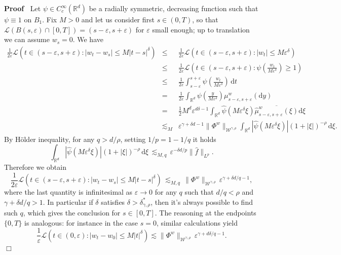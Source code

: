 \documentclass[10pt]{article}
\newcommand{\comma}{{,}}
\newcommand{\mathd}{\mathrm{d}}
\newenvironment{proof}{\noindent\textbf{Proof\ }}{\hspace*{\fill}$\Box$\medskip}
\begin{document}
\begin{proof}
  Let $\psi \in C^{\infty}_c (\mathbb{R}^d)$ be a radially symmetric,
  decreasing function such that $\psi \equiv 1$ on $B_1$. Fix $M > 0$ and let
  us consider first $s \in (0, T)$, so that $\mathcal{L} (B (s, \varepsilon)
  \cap [0, T]) = (s - \varepsilon, s + \varepsilon)$ for $\varepsilon$ small
  enough; up to translation we can assume $w_s = 0$. We have
  \begin{eqnarray*}
    \frac{1}{2 \varepsilon} \mathcal{L} (t \in (s - \varepsilon, s +
    \varepsilon) : | w_t - w_s | \leqslant M | t - s |^{\delta}) & \leqslant &
    \frac{1}{2 \varepsilon} \mathcal{L} (t \in (s - \varepsilon, s +
    \varepsilon) : | w_t | \leqslant M \varepsilon^{\delta})\\
    & \leqslant & \frac{1}{2 \varepsilon} \mathcal{L} \left( t \in (s -
    \varepsilon, s + \varepsilon) : \psi \left( \frac{w_t}{M
    \varepsilon^{\delta}} \right) \geqslant 1 \right)\\
    & \leqslant & \frac{1}{2 \varepsilon} \int_{s - \varepsilon}^{s +
    \varepsilon} \psi \left( \frac{w_t}{M \varepsilon^{\delta}} \right) \,
    \mathd t\\
    & = & \frac{1}{2 \varepsilon} \int_{\mathbb{R}^d} \psi \left( \frac{y}{M
    \varepsilon^{\delta}} \right) \mu_{s - \varepsilon, s + \varepsilon}^w
    (\mathd y)\\
    & = & \frac{1}{2} M^d \varepsilon^{d \delta - 1} \int_{\mathbb{R}^d}
    \hat{\psi} (M \varepsilon^{\delta} \xi) \overline{\hat{\mu}_{s -
    \varepsilon, s + \varepsilon}^w (\xi)} \mathd \xi\\
    & \lesssim_M & \varepsilon^{\gamma + \delta d - 1} \| \Phi^w
    \|_{\mathcal{W}^{\gamma \comma \rho}} \int_{\mathbb{R}^d} | \hat{\psi} (M
    \varepsilon^{\delta} \xi) |  (1 + | \xi |)^{- \rho} \, \mathd \xi .
  \end{eqnarray*}
  By H\"{o}lder inequality, for any $q > d / \rho$, setting $1 / p = 1 - 1 /
  q$ it holds
  \[ \int_{\mathbb{R}^d} | \hat{\psi} (M \varepsilon^{\delta} \xi) |  (1 + |
     \xi |)^{- \rho} \, \mathd \xi \, \lesssim_{M, q} \, \varepsilon^{- \delta
     d / p}  \| \hat{f} \|_{L^p} . \]
  Therefore we obtain
  \[ \frac{1}{2 \varepsilon} \mathcal{L} (t \in (s - \varepsilon, s +
     \varepsilon) : | w_t - w_s | \leqslant M | t - s |^{\delta}) \,
     \lesssim_{M, q} \, \| \Phi^w \|_{\mathcal{W}^{\gamma \comma \rho}} \,
     \varepsilon^{\gamma + \delta d / q - 1}, \]
  where the last quantity is infinitesimal as $\varepsilon \rightarrow 0$ for
  any $q$ such that $d / q < \rho$ and $\gamma + \delta d / q > 1$. In
  particular if $\delta$ satisfies $\delta > \delta^{\ast}_{\gamma, \rho}$,
  then it's always possible to find such $q$, which gives the conclusion for
  $s \in [0, T]$. The reasoning at the endpoints $\{ 0, T \}$ is analogous:
  for instance in the case $s = 0$, similar calculations yield
  \[ \frac{1}{\varepsilon} \mathcal{L} (t \in (0, \varepsilon) : | w_t - w_0 |
     \leqslant M | t |^{\delta}) \lesssim \| \Phi^w \|_{\mathcal{W}^{\gamma
     \comma \rho}} \, \varepsilon^{\gamma + d \delta / q - 1} . \]
\end{proof}
\end{document}
